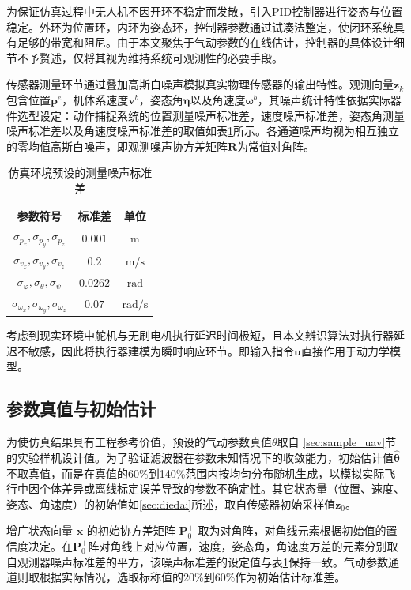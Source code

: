 为保证仿真过程中无人机不因开环不稳定而发散，引入PID控制器进行姿态与位置稳定。外环为位置环，内环为姿态环，控制器参数通过试凑法整定，使闭环系统具有足够的带宽和阻尼。由于本文聚焦于气动参数的在线估计，控制器的具体设计细节不予赘述，仅将其视为维持系统可观测性的必要手段。

传感器测量环节通过叠加高斯白噪声模拟真实物理传感器的输出特性。观测向量$\bm{z}_k$包含位置$\bm{p}^e$，机体系速度$\bm{v}^b$，姿态角$\bm{\eta}$以及角速度$\bm{\omega}^b$，其噪声统计特性依据实际器件选型设定：动作捕捉系统的位置测量噪声标准差，速度噪声标准差，姿态角测量噪声标准差以及角速度噪声标准差的取值如表\ref{tab:matlab_noise}所示。各通道噪声均视为相互独立的零均值高斯白噪声，即观测噪声协方差矩阵$\bm{R}$为常值对角阵。

\begin{table}[htbp]
    \centering
    \caption{仿真环境预设的测量噪声标准差}
    \label{tab:matlab_noise}
    \begin{tabular}{ccc}
    \toprule
    参数符号 & 标准差 & 单位 \\
    \midrule
    $\sigma_{p_x},\sigma_{p_y},\sigma_{p_z}$ & $0.001$ & $\mathrm{m}$ \\
    $\sigma_{v_x},\sigma_{v_y},\sigma_{v_z}$ & $0.2$ & $\mathrm{m/s}$ \\
    $\sigma_{\varphi},\sigma_{\theta},\sigma_{\psi}$ & $0.0262$ & $\mathrm{rad}$ \\
    $\sigma_{\omega_x},\sigma_{\omega_y},\sigma_{\omega_z}$ & $0.07$ & $\mathrm{rad/s}$ \\
    \bottomrule
    \end{tabular}
\end{table}

考虑到现实环境中舵机与无刷电机执行延迟时间极短，且本文辨识算法对执行器延迟不敏感，因此将执行器建模为瞬时响应环节。即输入指令$\bm{u}$直接作用于动力学模型。

\subsection{参数真值与初始估计}
为使仿真结果具有工程参考价值，预设的气动参数真值$\theta$取自
\ref{sec:sample_uav}节的实验样机设计值。为了验证滤波器在参数未知情况下的收敛能力，初始估计值$\hat{\bm{\theta}}$不取真值，而是在真值的60\%到140\%范围内按均匀分布随机生成，以模拟实际飞行中因个体差异或离线标定误差导致的参数不确定性。其它状态量（位置、速度、姿态、角速度）的初始值如\ref{sec:diedai}所述，取自传感器初始采样值$\bm{z}_0$。

增广状态向量 $\bm{x}$ 的初始协方差矩阵 $\bm{P}_0^+$ 取为对角阵，对角线元素根据初始值的置信度决定。在$\bm{P}_0^+$阵对角线上对应位置，速度，姿态角，角速度方差的元素分别取自观测器噪声标准差的平方，该噪声标准差的设定值与表\ref{tab:matlab_noise}保持一致。气动参数通道则取根据实际情况，选取标称值的20\%到60\%作为初始估计标准差。

